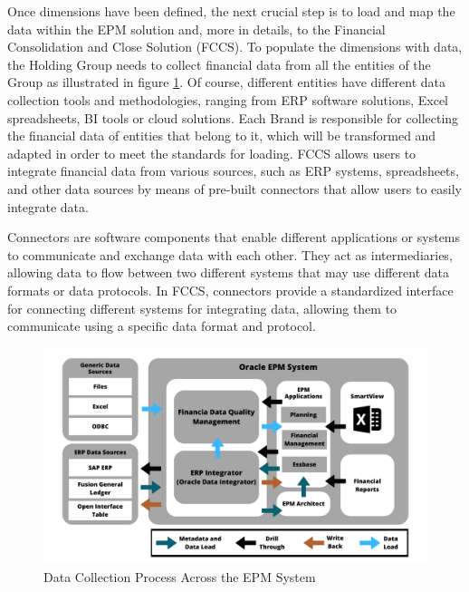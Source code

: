 \documentclass[12pt,a4paper,openright,twoside]{book}
\begin{document}
Once dimensions have been defined, the next crucial step is to load and map the data within the EPM solution and, more in details, to the Financial Consolidation and Close Solution (FCCS). 
%
To populate the dimensions with data, the Holding Group needs to collect financial data from all the entities of the Group as illustrated in figure \ref{fig:dataload}.
%
Of course, different entities have different data collection tools and methodologies, ranging from ERP software solutions, Excel spreadsheets, BI tools or cloud solutions.
%
Each Brand is responsible for collecting the financial data of entities that belong to it, which will be transformed and adapted in order to meet the standards for loading.  
%
FCCS allows users to integrate financial data from various sources, such as ERP systems, spreadsheets, and other data sources by means of pre-built connectors that allow users to easily integrate data.

Connectors are software components that enable different applications or systems to communicate and exchange data with each other. 
%
They act as intermediaries, allowing data to flow between two different systems that may use different data formats or data protocols.
%
In FCCS, connectors provide a standardized interface for connecting different systems for integrating data, allowing them to communicate using a specific data format and protocol.

\begin{figure}[ht]
	\centering
	\includegraphics[width=\linewidth]{figures/data-load.pdf}
	\caption{Data Collection Process Across the EPM System}
	\label{fig:dataload}
\end{figure}
\end{document}
